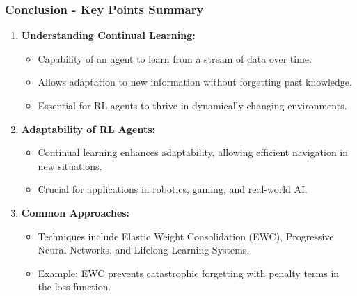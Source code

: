 \documentclass[aspectratio=169]{beamer}
\begin{document}
\begin{frame}[fragile]
    \frametitle{Conclusion - Key Points Summary}
    
    \begin{enumerate}
        \item \textbf{Understanding Continual Learning:}
        \begin{itemize}
            \item Capability of an agent to learn from a stream of data over time.
            \item Allows adaptation to new information without forgetting past knowledge.
            \item Essential for RL agents to thrive in dynamically changing environments.
        \end{itemize}
        
        \item \textbf{Adaptability of RL Agents:}
        \begin{itemize}
            \item Continual learning enhances adaptability, allowing efficient navigation in new situations.
            \item Crucial for applications in robotics, gaming, and real-world AI.
        \end{itemize}
        
        \item \textbf{Common Approaches:}
        \begin{itemize}
            \item Techniques include Elastic Weight Consolidation (EWC), Progressive Neural Networks, and Lifelong Learning Systems.
            \item Example: EWC prevents catastrophic forgetting with penalty terms in the loss function.
        \end{itemize}
    \end{enumerate}
\end{frame}
\end{document}
